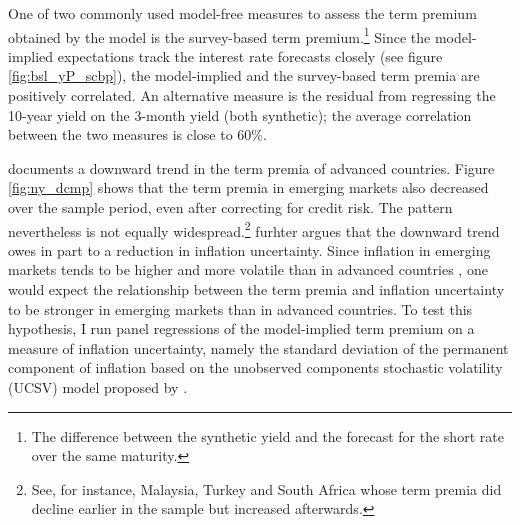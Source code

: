 {One of two commonly used model-free measures to assess the term premium obtained by the model is the survey-based term premium.\footnote{ The difference between the synthetic yield and the forecast for the short rate over the same maturity.}
Since the model-implied expectations track the interest rate forecasts closely (see figure \ref{fig:bsl_yP_scbp}), the model-implied and the survey-based term premia are positively correlated.
An alternative measure is the residual from regressing the 10-year yield on the 3-month yield (both synthetic); the average correlation between the two measures is close to 60\%.

\cite{Wright:2011} documents a downward trend in the term premia of advanced countries.
Figure \ref{fig:ny_dcmp} shows that the term premia in emerging markets also decreased over the sample period, even after correcting for credit risk. The pattern nevertheless is not equally widespread.\footnote{ See, for instance, Malaysia, Turkey and South Africa whose term premia did decline earlier in the sample but increased afterwards.}
\cite{Wright:2011} furhter argues that the downward trend 
owes in part to a reduction in inflation uncertainty.
Since inflation in emerging markets tends to be higher and more volatile than in advanced countries \citep{HaKoseOhnsorge:2019}, one would expect the relationship between the term premia and inflation uncertainty to be stronger in emerging markets than in advanced countries.
To test this hypothesis, I run panel regressions of the model-implied term premium on a measure of inflation uncertainty, namely the standard deviation of the permanent component of inflation based on the unobserved components stochastic volatility (UCSV) model proposed by \cite{StockWatson:2007}. 
}
